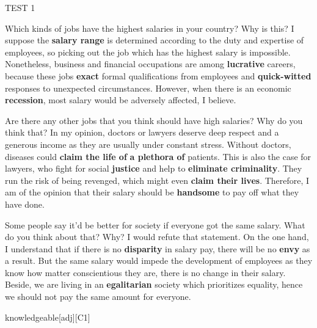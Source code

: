 \begin{glossarymc}[Cambridge 10]
\begin{test}{TEST 1}
    \begin{qa}{Which kinds of jobs have the highest salaries in your country? Why is this?}
    I suppose the \textbf{salary range} is determined according to the duty and expertise of employees, so picking out the job which has the highest salary is impossible. Nonetheless, business and financial occupations are among \textbf{lucrative} careers, because these jobs \textbf{exact} formal qualifications from employees and \textbf{quick-witted} responses to unexpected circumstances. However, when there is an economic \textbf{recession}, most salary would be adversely affected, I believe.
    \end{qa}

    \begin{qa}{Are there any other jobs that you think should have high salaries? Why do you think that?}
    In my opinion, doctors or lawyers deserve deep respect and a generous income as they are usually under constant stress. Without doctors, diseases could \textbf{claim the life of} \textbf{a plethora of} patients. This is also the case for lawyers, who fight for social \textbf{justice} and help to \textbf{eliminate criminality}. They run the risk of being revenged, which might even \textbf{claim their lives}. Therefore, I am of the opinion that their salary should be \textbf{handsome} to pay off what they have done.
    \end{qa}

    \begin{qa}{Some people say it'd be better for society if everyone got the same salary. What do you think about that? Why?}
    I would refute that statement. On the one hand, I understand that if there is no \textbf{disparity} in salary pay, there will be no \textbf{envy} as a result. But the same salary would impede the development of employees as they know how matter conscientious they are, there is no change in their salary. Beside, we are living in an \textbf{egalitarian} society which prioritizes equality, hence we should not pay the same amount for everyone.
    \end{qa}

        \begin{VocabExplain}[Part 3]
            \begin{ExplainCard}{knowledgeable}[adj][C1]
            \end{ExplainCard}


\end{VocabExplain}
\end{test}
\end{glossarymc}
